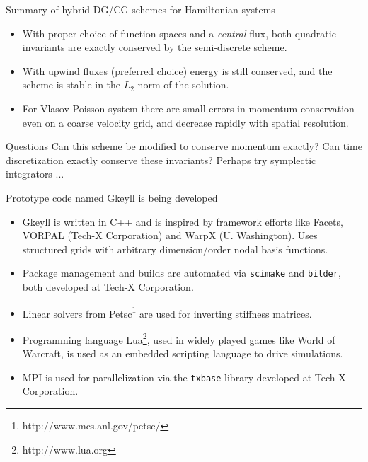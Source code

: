 \documentclass[pdf]{beamer}
\newcommand{\mypause}{}
\theoremstyle{definition}
\begin{document}
\begin{frame}{Summary of hybrid DG/CG schemes for Hamiltonian systems}

  \begin{itemize}
  \item With proper choice of function spaces and a \emph{central}
    flux, both quadratic invariants are exactly conserved by the
    semi-discrete scheme.
  \item With upwind fluxes (preferred choice) energy is still
    conserved, and the scheme is stable in the $L_2$ norm of the
    solution.
  \item For Vlasov-Poisson system there are small errors in momentum
    conservation even on a coarse velocity grid, and decrease rapidly
    with spatial resolution.
  \end{itemize}
  \mypause
  \begin{block}{Questions}
    Can this scheme be modified to conserve momentum exactly? Can time
    discretization exactly conserve these invariants?  Perhaps try
    symplectic integrators ...
  \end{block}

\end{frame}

\begin{frame}{Prototype code named Gkeyll is being developed}%

  \begin{itemize}
    \small
  \item Gkeyll is written in C++ and is inspired by framework efforts
    like Facets, VORPAL (Tech-X Corporation) and WarpX
    (U. Washington). Uses structured grids with arbitrary
    dimension/order nodal basis functions.
  \item Package management and builds are automated via {\tt scimake}
    and {\tt bilder}, both developed at Tech-X Corporation.
  \item Linear solvers from
    Petsc\footnote{http://www.mcs.anl.gov/petsc/} are used for
    inverting stiffness matrices.
  \item Programming language Lua\footnote{http://www.lua.org}, used in
    widely played games like World of Warcraft, is used as an embedded
    scripting language to drive simulations.
  \item MPI is used for parallelization via the {\tt txbase} library
    developed at Tech-X Corporation.
  \end{itemize}
  
\end{frame}
\end{document}
